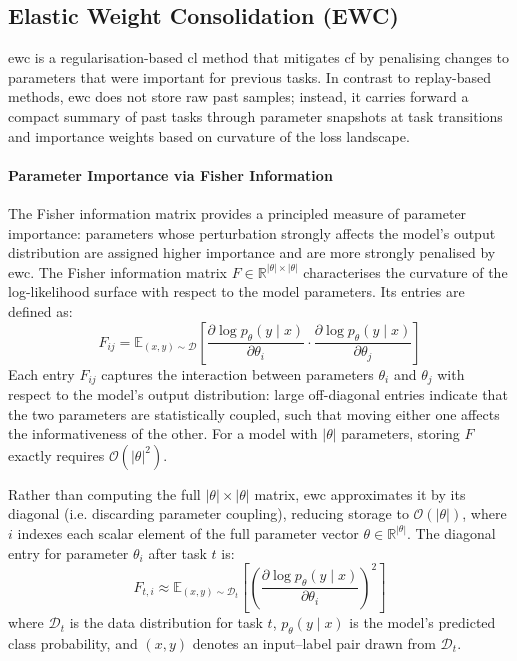 \subsection{Elastic Weight Consolidation (EWC)}

\gls{ewc} \cite{ll_ewc_2017} is a regularisation-based \gls{cl} method that mitigates \gls{cf} by penalising changes to parameters that were important for previous tasks. In contrast to replay-based methods, \gls{ewc} does not store raw past samples; instead, it carries forward a compact summary of past tasks through parameter snapshots at task transitions and importance weights based on curvature of the loss landscape.

\paragraph{Parameter Importance via Fisher Information}
The Fisher information matrix provides a principled measure of parameter importance: parameters whose perturbation strongly affects the model's output distribution are assigned higher importance and are more strongly penalised by \gls{ewc}. The Fisher information matrix $F \in \mathbb{R}^{|\theta| \times |\theta|}$ characterises the curvature of the log-likelihood surface with respect to the model parameters. Its entries are defined as:
%
\begin{equation}\label{eqn:ewc_fisher_full}
    F_{ij} = \mathbb{E}_{(x,y)\sim\mathcal{D}}\left[
        \frac{\partial \log p_\theta(y \mid x)}{\partial \theta_i} \cdot
        \frac{\partial \log p_\theta(y \mid x)}{\partial \theta_j}
    \right]
\end{equation}
%
Each entry $F_{ij}$ captures the interaction between parameters $\theta_i$ and $\theta_j$ with respect to the model's output distribution: large off-diagonal entries indicate that the two parameters are statistically coupled, such that moving either one affects the informativeness of the other. For a model with $|\theta|$ parameters, storing $F$ exactly requires $\mathcal{O}(|\theta|^2)$.

Rather than computing the full $|\theta| \times |\theta|$ matrix, \gls{ewc} approximates it by its diagonal (i.e. discarding parameter coupling), reducing storage to $\mathcal{O}(|\theta|)$, where $i$ indexes each scalar element of the full parameter vector $\theta \in \mathbb{R}^{|\theta|}$. The diagonal entry for parameter $\theta_i$ after task $t$ is:
%
\begin{equation}\label{eqn:ewc_fisher}
    F_{t,i} \approx \mathbb{E}_{(x,y)\sim\mathcal{D}_t}
    \left[
        \left(
            \frac{\partial \log p_\theta(y\mid x)}{\partial \theta_i}
        \right)^2
    \right]
\end{equation}
%
where $\mathcal{D}_t$ is the data distribution for task $t$, $p_\theta(y \mid x)$ is the model's predicted class probability, and $(x, y)$ denotes an input--label pair drawn from $\mathcal{D}_t$.

